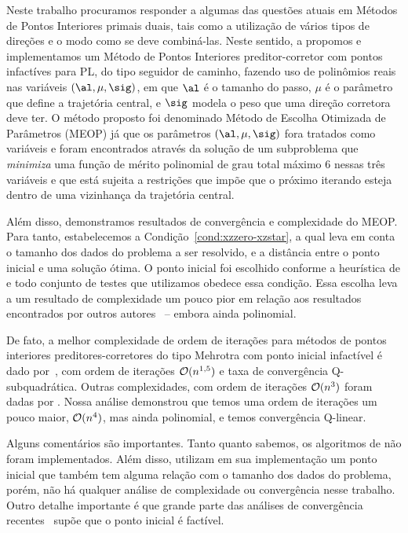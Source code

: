 \label{chap:final_remarks}






Neste trabalho procuramos responder a algumas das questões atuais em Métodos de Pontos Interiores primais duais, tais como a utilização de vários tipos de direções e o modo como se deve combiná-las. Neste sentido, a propomos e implementamos  um Método de Pontos Interiores preditor-corretor com pontos infactíves para \ac{PL}, do tipo seguidor de caminho, fazendo  uso de polinômios reais nas variáveis $(\al,\mu,\sig)$, em que $\al$ é o tamanho do passo, $\mu$ é o parâmetro que define a trajetória central, e $\sig$ modela o peso que uma direção corretora deve ter. O método proposto foi denominado Método de Escolha Otimizada de Parâmetros (MEOP) já que os  parâmetros $(\al,\mu,\sig)$ fora tratados como variáveis e foram encontrados  através da solução de um subproblema que \emph{minimiza} uma função de mérito polinomial de grau total máximo 6 nessas três variáveis e que está sujeita a restrições que impõe que o próximo iterando esteja dentro de uma vizinhança da trajetória central. 



Além disso, demonstramos resultados de convergência e complexidade do MEOP. Para tanto, estabelecemos a  Condição~\ref{cond:xzzero-xzstar}, a qual leva em conta o tamanho dos dados do problema a  ser  resolvido, e a distância entre o ponto inicial e uma solução ótima.  O ponto inicial foi escolhido  conforme a heurística de \textcite{Mehrotra:1992wr} e todo conjunto de testes que utilizamos obedece essa condição.  Essa escolha leva a um   resultado de complexidade um pouco pior  em relação aos resultados encontrados por outros autores~\cite{Zhang:1995fu,Zhang:2006ic,Wright:1993je,Wright:1996kj} -- embora ainda polinomial.


De fato, a melhor complexidade de ordem de iterações para métodos de pontos interiores preditores-corretores do tipo Mehrotra com ponto inicial infactível é dado por~\textcite{Zhang:1996it}, com ordem de iterações $\mathcal{O}(n^{\num{1.5}})$ e taxa de convergência Q-subquadrática. Outras complexidades, com ordem de iterações $\mathcal{O}(n^{\num{3}})$ foram dadas por \textcite{Zhang:2006ic,Wright:1996kj}. Nossa análise demonstrou que temos uma ordem de iterações um pouco maior, $\mathcal{O}(n^{\num{4}})$, mas ainda polinomial, e temos convergência Q-linear. 

Alguns  comentários são importantes. Tanto quanto sabemos, os algoritmos de \textcite{Zhang:1996it,Zhang:2006ic,Wright:1996kj} não foram implementados. Além disso, \textcite{Gertz:2003ji} utilizam em sua implementação um ponto inicial que também tem alguma relação com o tamanho dos dados do problema, porém, não há qualquer análise de complexidade ou convergência nesse trabalho. Outro detalhe importante é que  grande parte das análises de convergência recentes~\cite{Gondzio:2011ta} supõe que o ponto inicial é factível. 

